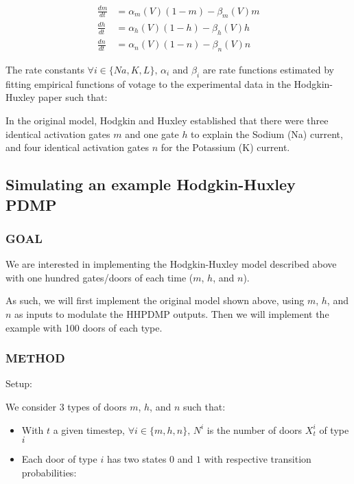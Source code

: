 \documentclass[
]{article}
\providecommand{\tightlist}{%
  \setlength{\itemsep}{0pt}\setlength{\parskip}{0pt}}
\begin{document}
\begin{align}
\frac{dm}{dt}&=\alpha_m(V)(1-m)-\beta_m(V)m\\
\frac{dh}{dt}&=\alpha_h(V)(1-h)-\beta_h(V)h\\
\frac{dn}{dt}&=\alpha_n(V)(1-n)-\beta_n(V)n
\end{align}

The rate constants \(\forall i \in \{Na, K, L\},\,\alpha_i\) and
\(\beta_i\) are rate functions estimated by fitting empirical functions
of votage to the experimental data in the Hodgkin-Huxley paper such
that:

In the original model, Hodgkin and Huxley established that there were
three identical activation gates \(m\) and one gate \(h\) to explain the
Sodium (Na) current, and four identical activation gates \(n\) for the
Potassium (K) current.

\hypertarget{simulating-an-example-hodgkin-huxley-pdmp}{%
\subsection{Simulating an example Hodgkin-Huxley
PDMP}\label{simulating-an-example-hodgkin-huxley-pdmp}}

\hypertarget{goal}{%
\subsubsection{GOAL}\label{goal}}

We are interested in implementing the Hodgkin-Huxley model described
above with one hundred gates/doors of each time (\(m\), \(h\), and
\(n\)).

As such, we will first implement the original model shown above, using
\(m\), \(h\), and \(n\) as inputs to modulate the HHPDMP outputs. Then
we will implement the example with 100 doors of each type.

\hypertarget{method}{%
\subsubsection{METHOD}\label{method}}

Setup:

We consider 3 types of doors \(m\), \(h\), and \(n\) such that:

\begin{itemize}
\tightlist
\item
  With \(t\) a given timestep, \(\forall i\in\{m, h, n\},\,N^i\) is the
  number of doors \(X_t^i\) of type \(i\)
\item
  Each door of type \(i\) has two states \(0\) and \(1\) with respective
  transition probabilities:
\end{itemize}
\end{document}
